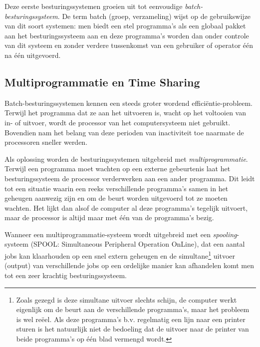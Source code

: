 Deze eerste besturingssystemen groeien uit tot eenvoudige
\emph{batch-besturingssysteem}. De term batch (groep,
verzameling) wijst op de gebruikswijze van dit soort systemen: men
biedt een stel programma's als een globaal pakket aan het
besturingssysteem aan en deze programma's worden dan onder controle
van dit systeem en zonder verdere tussenkomst van een gebruiker of
operator \'e\'en na \'e\'en uitgevoerd.

\subsection{Multiprogrammatie en Time Sharing}

Batch-besturingssystemen kennen een steeds groter wordend
effici\"entie-probleem. Terwijl het programma dat ze aan het uitvoeren
is, wacht op het voltooien van in- of uitvoer, wordt de processor van
het computersysteem niet gebruikt. Bovendien nam het belang van deze
perioden van inactiviteit toe naarmate de processoren sneller
werden.

Als oplossing worden de besturingssystemen uitgebreid met
\emph{multiprogrammatie}. Terwijl een programma moet
wachten op een externe gebeurtenis laat het besturingssysteem de
processor verderwerken aan een ander programma. Dit leidt tot een
situatie waarin een reeks verschillende programma's samen in het
geheugen aanwezig zijn en om de beurt worden uitgevoerd tot ze moeten
wachten. Het lijkt dan alsof de computer al deze programma's tegelijk
uitvoert, maar de processor is altijd maar met \'e\'en van de programma's
bezig.

Wanneer een multiprogrammatie-systeem wordt uitgebreid met een
\emph{spooling}-systeem (SPOOL: Simultaneous
Peripheral Operation OnLine), dat een aantal jobs kan klaarhouden op
een snel extern geheugen en de simultane\footnote{Zoals gezegd is deze simultane
uitvoer slechts schijn, de computer werkt eigenlijk om de beurt aan de
verschillende programma's, maar het probleem is wel re\"eel. Als deze
programma's b.v. regelmatig een lijn naar een printer sturen is het natuurlijk
niet de bedoeling dat de uitvoer naar de printer van beide programma's op
\'e\'en blad vermengd wordt.} uitvoer (output) van verschillende jobs op een
ordelijke manier kan afhandelen komt men tot een zeer krachtig
besturingssysteem.

